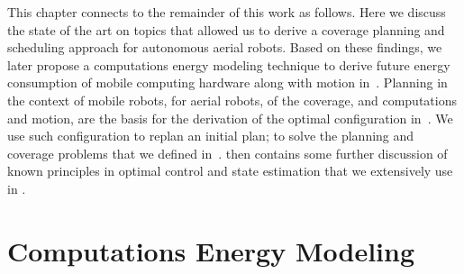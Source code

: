 This chapter connects to the remainder of this work as follows. Here we discuss the state of the art on topics that allowed us to derive a coverage planning and scheduling approach for autonomous aerial robots. Based on these findings, we later propose a computations energy modeling technique to derive
future energy consumption of mobile computing hardware along with motion in~. Planning in the context of mobile robots, for aerial robots, of the coverage, and computations and motion, are the basis for the derivation of the optimal configuration in~. We use such configuration to replan an initial plan; to solve the planning and coverage problems that we defined in~.  then contains some further discussion of known principles in optimal control and state estimation that we extensively use in .

\section{Computations Energy Modeling}
\label{sec:soa-ene-mod}

